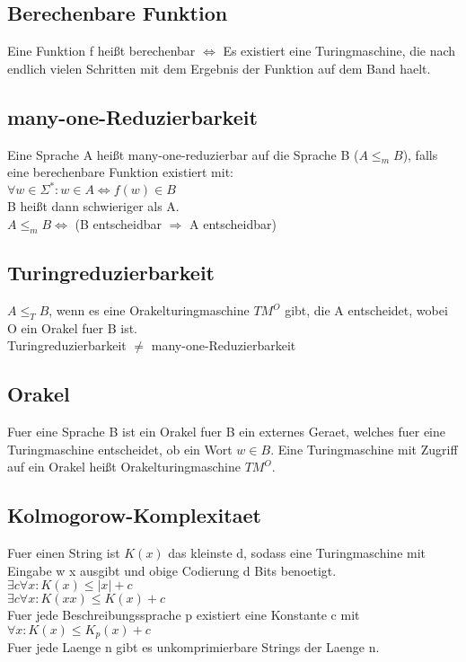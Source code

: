 \documentclass[a4paper]{scrreprt}
\begin{document}
\subsection{Berechenbare Funktion}
Eine Funktion f heißt berechenbar $\Leftrightarrow$ Es existiert eine Turingmaschine, die nach endlich vielen Schritten mit dem Ergebnis der Funktion auf dem Band haelt.

\subsection{many-one-Reduzierbarkeit}
Eine Sprache A heißt many-one-reduzierbar auf die Sprache B ($A \le_m B$), falls eine berechenbare Funktion existiert mit:\\
$\forall w \in \Sigma^*: w \in A \Leftrightarrow f(w) \in B$\\
B heißt dann schwieriger als A.\\
$A \le_m B \Leftrightarrow$ (B entscheidbar $\Rightarrow$ A entscheidbar)

\subsection{Turingreduzierbarkeit}
$A \le_T B$, wenn es eine Orakelturingmaschine $TM^O$ gibt, die A entscheidet, wobei O ein Orakel fuer B ist.\\
Turingreduzierbarkeit $\neq$ many-one-Reduzierbarkeit

\subsection{Orakel}
Fuer eine Sprache B ist ein Orakel fuer B ein externes Geraet, welches fuer eine Turingmaschine entscheidet, ob ein Wort $w \in B$.
Eine Turingmaschine mit Zugriff auf ein Orakel heißt Orakelturingmaschine $TM^O$.

\subsection{Kolmogorow-Komplexitaet}
Fuer einen String ist $K(x)$ das kleinste d, sodass eine Turingmaschine mit Eingabe w x ausgibt und obige Codierung d Bits benoetigt.\\
$\exists c \forall x: K(x) \le |x| + c$\\
$\exists c \forall x: K(xx) \le K(x) + c$\\
Fuer jede Beschreibungssprache p existiert eine Konstante c mit $\forall x: K(x) \le K_p(x) + c$\\
Fuer jede Laenge n gibt es unkomprimierbare Strings der Laenge n.
\end{document}
